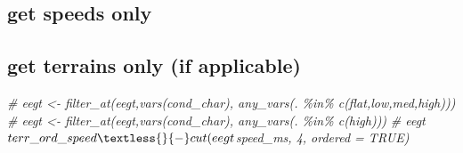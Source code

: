 \documentclass[
]{article}
\newenvironment{Shaded}{\begin{snugshade}}{\end{snugshade}}
\newcommand{\CommentTok}[1]{\textcolor[rgb]{0.56,0.35,0.01}{\textit{#1}}}
\newcommand{\FunctionTok}[1]{\textcolor[rgb]{0.13,0.29,0.53}{\textbf{#1}}}
\newcommand{\NormalTok}[1]{#1}
\newcommand{\OtherTok}[1]{\textcolor[rgb]{0.56,0.35,0.01}{#1}}
\newcommand{\SpecialCharTok}[1]{\textcolor[rgb]{0.81,0.36,0.00}{\textbf{#1}}}
\newcommand{\StringTok}[1]{\textcolor[rgb]{0.31,0.60,0.02}{#1}}
\begin{document}
\hypertarget{get-speeds-only}{%
\subsection{get speeds only}\label{get-speeds-only}}

\begin{Shaded}
\end{Shaded}

\hypertarget{get-terrains-only-if-applicable}{%
\subsection{get terrains only (if
applicable)}\label{get-terrains-only-if-applicable}}

\begin{Shaded}
\begin{Highlighting}[]
\CommentTok{\# eegt \textless{}{-} filter\_at(eegt,vars(\textquotesingle{}cond\_char\textquotesingle{}), any\_vars(. \%in\% c(\textquotesingle{}flat\textquotesingle{},\textquotesingle{}low\textquotesingle{},\textquotesingle{}med\textquotesingle{},\textquotesingle{}high\textquotesingle{})))}
\CommentTok{\# eegt \textless{}{-} filter\_at(eegt,vars(\textquotesingle{}cond\_char\textquotesingle{}), any\_vars(. \%in\% c(\textquotesingle{}high\textquotesingle{})))}
\CommentTok{\# eegt$terr\_ord\_speed \textless{}{-} cut(eegt$speed\_ms, 4, ordered = TRUE)}
\end{Highlighting}
\end{Shaded}
\end{document}
